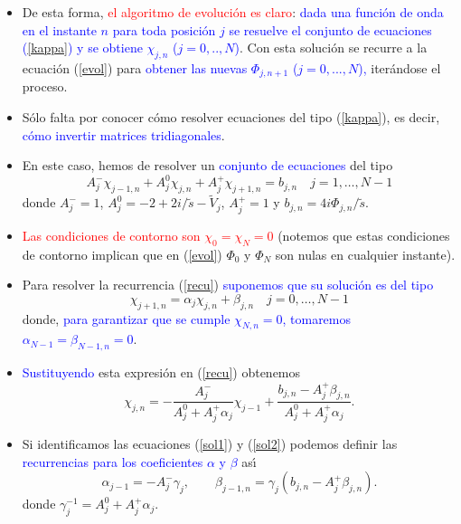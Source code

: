 \documentclass[12pt,spanish]{iopart}
\def\az{\textcolor{blue}}
\def\ro{\textcolor{red}}
\begin{document}
\begin{itemize}
\item De esta forma, \ro{el algoritmo de evoluci{\'o}n es claro}: \az{dada una funci{\'o}n de onda en el instante $n$ para
toda posici{\'o}n $j$ se resuelve el conjunto de ecuaciones (\ref{kappa}) y se obtiene $\chi_{j,n}$ ($j=0,..,N$)}. Con esta 
soluci{\'o}n
se recurre a la ecuaci{\'o}n (\ref{evol}) para \az{obtener las nuevas $\Phi_{j,n+1}$ ($j=0,...,N$),} iter\'andose el proceso.

\item S\'olo falta por conocer c\'omo resolver ecuaciones del tipo (\ref{kappa}), es decir, \az{c\'omo invertir 
matrices tridiagonales}.

\item En este caso, hemos de resolver un \az{conjunto de ecuaciones} del tipo
%
\begin{equation}
A_j^{-}\chi_{j-1,n}+A_j^0\chi_{j,n}+A_j^+\chi_{j+1,n}=b_{j,n} \quad j=1,\ldots ,N-1
\label{recu}
\end{equation}
%
donde $A_j^-=1$, $A_j^0=-2+2i/\tilde s-\tilde V_j$, $A_j^+=1$ y $b_{j,n}=4i\Phi_{j,n}/\tilde s$.

\item \ro{Las condiciones de contorno son $\chi_0=\chi_{N}=0$} (notemos que estas condiciones de contorno implican que en (\ref{evol})
 $\Phi_{0}$ y $\Phi_{N}$ son nulas en cualquier instante).

\item Para resolver la recurrencia (\ref{recu}) \az{suponemos que su soluci{\'o}n es del tipo}
%
\begin{equation}
\chi_{j+1,n}=\alpha_{j}\chi_{j,n}+\beta_{j,n}\quad j=0,\ldots,N-1
\label{sol1}
\end{equation}
%
donde, \az{para garantizar que se cumple $\chi_{N,n}=0$, tomaremos  $\alpha_{N-1}=\beta_{N-1,n}=0$}. 

\item \az{Sustituyendo} esta expresi{\'o}n en (\ref{recu}) obtenemos
%
\begin{equation}
\chi_{j,n}=-\frac{A_j^-}{A_j^0+A_j^+\alpha_j}\chi_{j-1}+\frac{b_{j,n}-A_j^+\beta_{j,n}}{A_j^0+A_j^+\alpha_j}.
\label{sol2}
\end{equation}
%

\item Si identificamos las ecuaciones (\ref{sol1}) y (\ref{sol2}) podemos definir las \az{recurrencias para los coeficientes $\alpha$ y
$\beta$} as\'{\i}
%
\begin{equation}
\alpha_ {j-1}=-A_j ^-\gamma_j, \qquad
\beta_{j-1,n}=\gamma_j\left(b_{j,n}-A_j^+\beta_{j,n}  \right).
\label{beta}
\end{equation}
%
donde $\gamma_j^{-1}=A_j^0+A_j^+\alpha_j$. 


\end{itemize}
\end{document}
